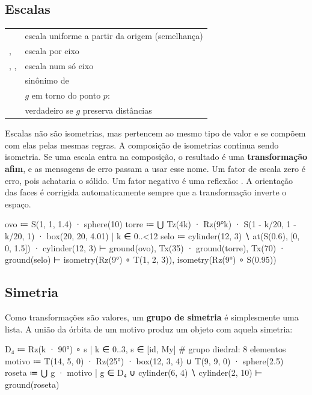 \subsection{Escalas}
\begin{longtable}{@{}L{0.3}L{0.70}@{}}
\toprule
{} & escala uniforme a partir da origem (semelhança) \\
,  & escala por eixo \\
, ,  & escala num só eixo \\
 & sinônimo de  \\
 & $g$ em torno do ponto $p$:  \\
 & verdadeiro se $g$ preserva distâncias \\
\bottomrule
\end{longtable}
Escalas não são isometrias, mas pertencem ao mesmo tipo de valor e se compõem com elas pelas mesmas regras. A composição de
isometrias continua sendo isometria. Se uma escala entra na composição, o resultado é uma \textbf{transformação afim}, e as
mensagens de erro passam a usar esse nome. Um fator de escala zero é erro, pois achataria o sólido. Um fator negativo é uma
reflexão: . A orientação das faces é corrigida automaticamente sempre que a transformação inverte o espaço.
\begin{csg}[run, id=affine]
ovo     ≔ S(1, 1, 1.4) · sphere(10)
torre   ≔ ⋃{ Tz(4k) · Rz(9°k) · S(1 - k/20, 1 - k/20, 1) · box(20, 20, 4.01) | k ∈ 0..<12 }
selo    ≔ cylinder(12, 3) ∖ at(S(0.6), [0, 0, 1.5]) · cylinder(12, 3)
⊢ ground(ovo), Tx(35) · ground(torre), Tx(70) · ground(selo)
⊢ isometry(Rz(9°) ∘ T(1, 2, 3)), isometry(Rz(9°) ∘ S(0.95))
\end{csg}

\subsection{Simetria}
Como transformações são valores, um \textbf{grupo de simetria} é simplesmente uma lista. A união da órbita de um motivo produz um
objeto com aquela simetria:
\begin{csg}[run, id=d4]
D₄ ≔ { Rz(k · 90°) ∘ s | k ∈ 0..3, s ∈ [id, My] }      # grupo diedral: 8 elementos
motivo ≔ T(14, 5, 0) · Rz(25°) · box(12, 3, 4) ∪ T(9, 9, 0) · sphere(2.5)
roseta ≔ ⋃{ g · motivo | g ∈ D₄ } ∪ cylinder(6, 4) ∖ cylinder(2, 10)
⊢ ground(roseta)
\end{csg}

